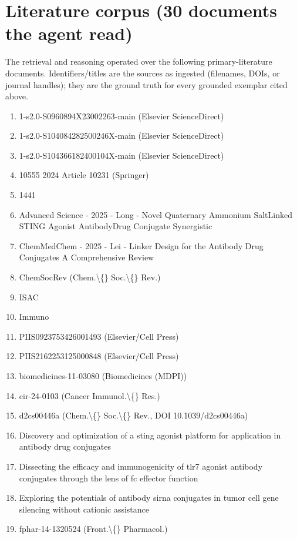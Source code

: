 \documentclass[10pt]{article}
\begin{document}
\section{Literature corpus (30 documents the agent read)}
The retrieval and reasoning operated over the following primary-literature documents. Identifiers/titles are the sources as ingested (filenames, DOIs, or journal handles); they are the ground truth for every grounded exemplar cited above.

\begin{enumerate}\setlength{\itemsep}{0pt}\small
\item 1-s2.0-S0960894X23002263-main (Elsevier ScienceDirect)
\item 1-s2.0-S104084282500246X-main (Elsevier ScienceDirect)
\item 1-s2.0-S104366182400104X-main (Elsevier ScienceDirect)
\item 10555 2024 Article 10231 (Springer)
\item 1441
\item Advanced Science - 2025 - Long - Novel Quaternary Ammonium SaltLinked STING Agonist AntibodyDrug Conjugate  Synergistic
\item ChemMedChem - 2025 - Lei - Linker Design for the Antibody Drug Conjugates  A Comprehensive Review
\item ChemSocRev (Chem.\textbackslash\{\} Soc.\textbackslash\{\} Rev.)
\item ISAC
\item Immuno
\item PIIS0923753426001493 (Elsevier/Cell Press)
\item PIIS2162253125000848 (Elsevier/Cell Press)
\item biomedicines-11-03080 (Biomedicines (MDPI))
\item cir-24-0103 (Cancer Immunol.\textbackslash\{\} Res.)
\item d2cs00446a (Chem.\textbackslash\{\} Soc.\textbackslash\{\} Rev., DOI 10.1039/d2cs00446a)
\item Discovery and optimization of a sting agonist platform for application in antibody drug conjugates
\item Dissecting the efficacy and immunogenicity of tlr7 agonist antibody conjugates through the lens of fc effector function
\item Exploring the potentials of antibody sirna conjugates in tumor cell gene silencing without cationic assistance
\item fphar-14-1320524 (Front.\textbackslash\{\} Pharmacol.)

\end{enumerate}
\end{document}
